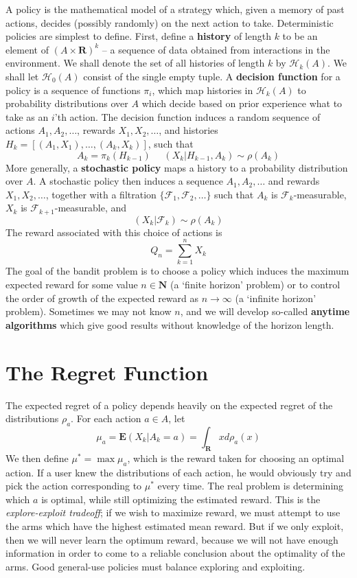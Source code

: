 A policy is the mathematical model of a strategy which, given a memory of past actions, decides (possibly randomly) on the next action to take. Deterministic policies are simplest to define. First, define a {\bf history} of length $k$ to be an element of $(A \times \mathbf{R})^k$ -- a sequence of data obtained from interactions in the environment. We shall denote the set of all histories of length $k$ by $\mathcal{H}_k(A)$. We shall let $\mathcal{H}_0(A)$ consist of the single empty tuple. A {\bf decision function} for a policy is a sequence of functions $\pi_i$, which map histories in $\mathcal{H}_k(A)$ to probability distributions over $A$ which decide based on prior experience what to take as an $i$'th action. The decision function induces a random sequence of actions $A_1, A_2, \dots$, rewards $X_1, X_2, \dots$, and histories $H_k = [(A_1,X_1), \dots, (A_k,X_k)]$, such that
%
\[ A_k = \pi_k(H_{k-1})\ \ \ \ \ \ (X_k | H_{k-1}, A_k) \sim \rho(A_k) \]
%
More generally, a {\bf stochastic policy} maps a history to a probability distribution over $A$. A stochastic policy then induces a sequence $A_1, A_2, \dots$ and rewards $X_1, X_2, \dots$, together with a filtration $\{ \mathcal{F}_1, \mathcal{F}_2, \dots \}$ such that $A_k$ is $\mathcal{F}_k$-measurable, $X_k$ is $\mathcal{F}_{k+1}$-measurable, and
%
\[ (X_k | \mathcal{F}_k) \sim \rho(A_k) \]
%
The reward associated with this choice of actions is
%
\[ Q_n = \sum_{k = 1}^n X_k \]
%
The goal of the bandit problem is to choose a policy which induces the maximum expected reward for some value $n \in \mathbf{N}$ (a `finite horizon' problem) or to control the order of growth of the expected reward as $n \to \infty$ (a `infinite horizon' problem). Sometimes we may not know $n$, and we will develop so-called {\bf anytime algorithms} which give good results without knowledge of the horizon length.

\section{The Regret Function}

The expected regret of a policy depends heavily on the expected regret of the distributions $\rho_a$. For each action $a \in A$, let
%
\[ \mu_a = \mathbf{E}(X_k | A_k = a) = \int_\mathbf{R} x d \rho_a(x) \]
%
We then define $\mu^* = \max \mu_a$, which is the reward taken for choosing an optimal action. If a user knew the distributions of each action, he would obviously try and pick the action corresponding to $\mu^*$ every time. The real problem is determining which $a$ is optimal, while still optimizing the estimated reward. This is the {\it explore-exploit tradeoff}; if we wish to maximize reward, we must attempt to use the arms which have the highest estimated mean reward. But if we only exploit, then we will never learn the optimum reward, because we will not have enough information in order to come to a reliable conclusion about the optimality of the arms. Good general-use policies must balance exploring and exploiting.

